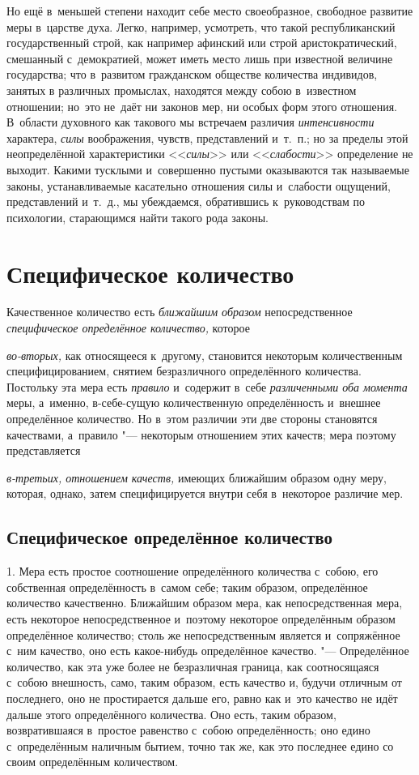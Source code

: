 Но ещё в~меньшей степени находит себе место своеобразное, свободное развитие
меры в~царстве духа. Легко, например, усмотреть, что такой республиканский
государственный строй, как например афинский или строй аристократический,
смешанный с~демократией, может иметь место лишь при известной величине
государства; что в~развитом гражданском обществе количества индивидов, занятых
в различных промыслах, находятся между собою в~известном отношении; но~это
не~даёт ни законов мер, ни особых форм этого отношения. В~области духовного
как такового мы встречаем различия {\em интенсивности} характера, {\em силы}
воображения, чувств, представлений и~т.~п.; но за пределы этой неопределённой
характеристики <<{\em силы}>> или <<{\em слабости}>> определение не выходит.
Какими тусклыми и~совершенно пустыми оказываются так называемые законы,
устанавливаемые касательно отношения силы и~слабости ощущений, представлений
и~т.~д., мы убеждаемся, обратившись к~руководствам по психологии, старающимся
найти такого рода законы.

\section{Специфическое количество}

Качественное количество есть {\em ближайшим образом} непосредственное
{\em специфическое определённое количество,} которое

{\em во-вторых,} как относящееся к~другому, становится некоторым количественным
специфицированием, снятием безразличного определённого количества. Постольку
эта мера есть {\em правило} и~содержит в~себе {\em различенными оба момента}
меры, а~именно, в-себе-сущую количественную определённость и~внешнее
определённое количество. Но в~этом различии эти две стороны становятся
качествами, а~правило "--- некоторым отношением этих качеств; мера поэтому
представляется

{\em в-третьих, отношением качеств,} имеющих ближайшим образом одну меру,
которая, однако, затем специфицируется внутри себя в~некоторое различие мер.

\subsection{Специфическое определённое количество}

1. Мера есть простое соотношение определённого количества с~собою, его
собственная определённость в~самом себе; таким образом, определённое количество
качественно. Ближайшим образом мера, как непосредственная мера, есть некоторое
непосредственное и~поэтому некоторое определённым образом определённое
количество; столь же непосредственным является и~сопряжённое с~ним качество,
оно есть какое-нибудь определённое качество. "--- Определённое количество, как
эта уже более не безразличная граница, как соотносящаяся с~собою внешность,
само, таким образом, есть качество и, будучи отличным от последнего, оно не
простирается дальше его, равно как и~это качество не идёт дальше этого
определённого количества. Оно есть, таким образом, возвратившаяся в~простое
равенство с~собою определённость; оно едино с~определённым наличным бытием,
точно так же, как это последнее едино со своим определённым количеством.


